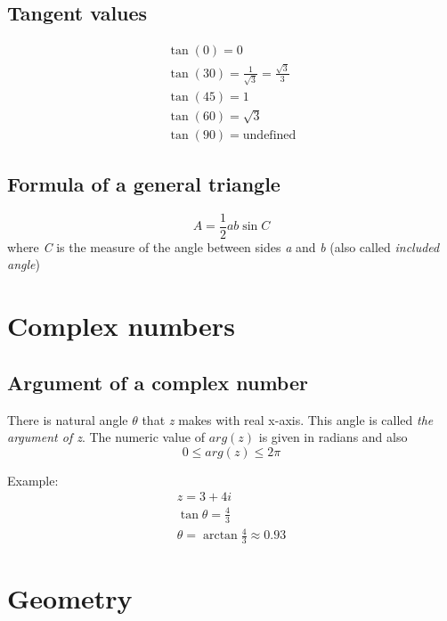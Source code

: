 \documentclass{article}
\begin{document}

\subsection{Tangent values}
\begin{equation}
  \begin{gathered}
    \tan(0) = 0 \\
    \tan(30) = \frac{1}{\sqrt{3}} = \frac{\sqrt{3}}{3} \\
    \tan(45) = 1 \\
    \tan(60) = \sqrt{3} \\
    \tan(90) = \text{undefined}
  \end{gathered}
\end{equation}

\subsection{Formula of a general triangle}

\begin{equation}
  A = \frac{1}{2}ab \sin{C}
\end{equation}
where \textit{C} is the measure of the angle between sides \textit{a} and \textit{b} (also called \textit{included angle})

\section{Complex numbers}
\subsection{Argument of a complex number}
There is natural angle $\theta$ that \textit{z} makes with real x-axis. This angle is called \textit{the argument of z}. The numeric value of $arg(z)$ is given in radians and also
\begin{equation}
0 \leq arg(z) \leq 2\pi
\end{equation}

Example:
\begin{equation}
  \begin{gathered}
  z = 3 + 4i \\
  \tan \theta = \frac{4}{3} \\
  \theta = \arctan\frac{4}{3} \approx 0.93
  \end{gathered}
\end{equation}

\section{Geometry}
\end{document}
